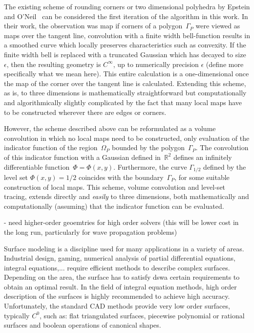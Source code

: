 \documentclass[11pt, oneside]{article}
\newcommand\bbR{\mathbb R}
\begin{document}
The existing scheme of rounding corners or two dimensional polyhedra by Epstein and 
O'Neil~\cite{epsteinXXXX}
can be considered the first iteration of the algorithm in this work. In their work,
the observation was map if corners of a polygon~$\Gamma_P$ were viewed as maps over the tangent
line, convolution with a finite width bell-function results in a smoothed curve which 
locally preserves characteristics such as convexity. If the finite width bell is replaced
with a truncated Gaussian which has decayed to size~$\epsilon$, then the resulting 
geometry is $C^\infty$, up to numerically precision $\epsilon$ (define more specifically
what we mean here). This entire calculation is a one-dimensional once the map of the
corner over the tangent line is calculated. Extending this scheme, as is, to three dimensions
is mathematically straightforward but computationally and algorithmically slightly complicated
by the fact that many local maps have to be constructed wherever there are edges or
corners.

However, the scheme described above can be reformulated as a volume convolution in which no
local maps need to be constructed, only evaluation of the indicator function of the
region~$\Omega_P$ bounded by the polygon~$\Gamma_P$. The convolution of
this indicator function with a Gaussian defined in~$\bbR^2$ defines an infinitely
differentiable function~$\Phi = \Phi(x,y)$. Furthermore, the curve $\Gamma_{1/2}$ defined
by the level set $\Phi(x,y) = 1/2$ coincides with the boundary~$\Gamma_P$, for some suitable
construction of local maps. This scheme, volume convolution and level-set tracing, extends
directly and \emph{easily} to three dimensions, both mathematically and computationally (assuming)
that the indicator function can be evaluated.




- need higher-order geoemtries for high order solvers (this will be
lower cost in the long run, particularly for wave propagation
problems)

Surface modeling is a discipline used for many applications in a variety of areas. Industrial design, gaming, numerical analysis of partial differential equations, integral equations,... require efficient methods to describe complex surfaces. Depending on the area, the surface has to satisfy dswa certain requirements to obtain an optimal result. In the field of integral equation methods, high order description of the surfaces is highly recommended to achieve high accuracy. Unfortunately, the standard CAD methods provide very low order surfaces, typically $C^0$, such as: flat triangulated surfaces, piecewise polynomial or rational surfaces and boolean operations of canonical shapes.
\end{document}
